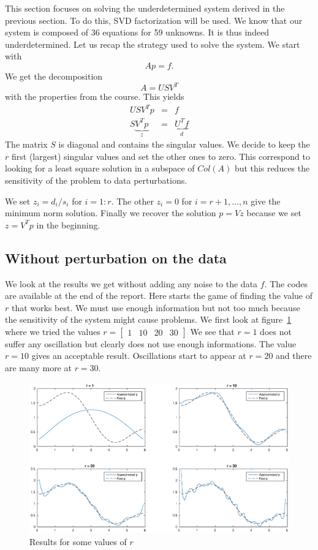 This section focuses on solving the underdetermined system derived in the previous section. To do this, SVD factorization will be used. \newline
We know that our system is composed of 36 equations for 59 unknowns. It is thus indeed underdetermined. Let us recap the strategy used to solve the system. We start with $$Ap=f.$$
We get the decomposition $$A = USV^{T}$$
with the properties from the course.
This yields
\begin{eqnarray*}
USV^{T}p & = & f\\
S\underbrace{V^{T }p}_{z} & = & \underbrace{U^{T}f}_{d}
\end{eqnarray*}
The matrix $S$ is diagonal and contains the singular values. We decide to keep the $r$ first (largest) singular values and set the other ones to zero. This correspond to looking for a least square solution in a subspace of $Col(A)$ but this reduces the sensitivity of the problem to data perturbations.


We set $z_{i}= d_{i}/s_{i}$ for $i = 1:r$. The other $z_{i}=0$ for $i = r+1,\dots,n$ give the minimum norm solution. Finally we recover the solution $p=Vz$ because we set $z=V^{T}p$ in the beginning.

\subsection*{Without perturbation on the data}
We look at the results we get without adding any noise to the data $f$. The codes are available at the end of the report. Here starts the game of finding the value of $r$ that works best. We must use enough information but not too much because the sensitivity of the system might cause problems. We first look at figure~\ref{fig:nn0} where we tried the values $r= \begin{bmatrix}
1 & 10 & 20 & 30 
\end{bmatrix}$
We see that $r=1$ does not suffer any oscillation but clearly does not use enough informations. The value $r=10$ gives an acceptable result. Oscillations start to appear at $r=20$ and there are many more at $r=30$.
\begin{figure}[!h]
\centering
\includegraphics[scale = 0.5]{./nn0.eps}
\caption{Results for some values of $r$}
\label{fig:nn0}
\end{figure}

